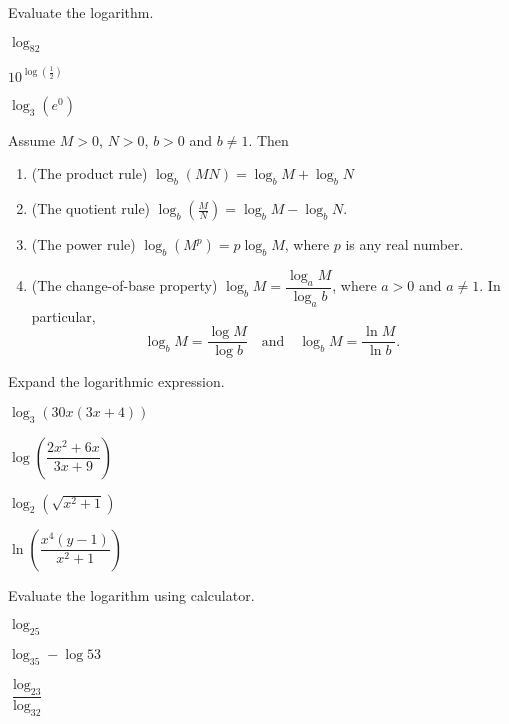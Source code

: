 \begin{example}
Evaluate the logarithm.\\
  \begin{enumerate*}
  \item
    $\log_82$
  \item
    $10^{\log(\frac{1}{2})}$
  \item
    $\log_3(e^0)$\hfill\null
  \end{enumerate*}
\end{example}

\begin{proposition}
  Assume $M>0$, $N>0$, $b>0$ and $b\neq 1$. Then 

  \begin{enumerate}
  \item
    (The product rule) $\log_b(MN)=\log_bM+\log_bN$
  \item
    (The quotient rule) $\log_b(\frac MN)=\log_bM-\log_bN$.
  \item
    (The power rule) $\log_b(M^p)=p\log_bM$, where $p$ is any real
    number.
  \item
    (The change-of-base property) $\log_bM=\dfrac{\log_aM}{\log_ab}$,
    where $a>0$ and $a\neq 1$.
     In particular, \[
     \log_bM=\dfrac{\log M}{\log b} \quad\text{and}\quad \log_bM=\dfrac{\ln M}{\ln b}.
     \]
  \end{enumerate}
 \end{proposition}

 \begin{example}
  Expand the logarithmic expression.\\
  \begin{enumerate*}
   \item $\log_3(30x(3x+4))$
   \item $\log\left(\dfrac{2x^2+6x}{3x+9} \right)$
   \item $\log_2(\sqrt{x^2+1})$
   \item $\ln\left (\dfrac{x^4(y-1)}{x^2+1}\right)$
   \hfill\null
  \end{enumerate*}
 \end{example}

 \newpage

 \begin{example}
  Evaluate the logarithm using calculator.\\
  \begin{enumerate*}
    \item $\log_25$
    \item $\log_35-\log 53$
    \item $\dfrac{\log_23}{\log_32}$\hfill\null
  \end{enumerate*}
 \end{example}
 
